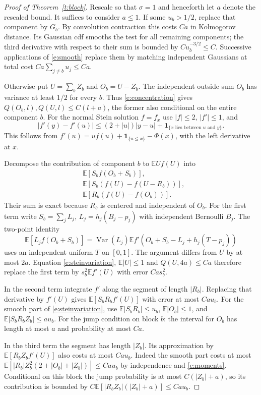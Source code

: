 \documentclass[11pt]{article}
\newcommand{\E}{\mathbb E}
\newcommand{\Var}{\operatorname{Var}}
\newcommand{\ind}{\mathbf1}
\numberwithin{equation}{section}
\begin{document}
\begin{proof}[Proof of Theorem~\ref{t:block}]
Rescale so that $\sigma=1$ and henceforth let $a$ denote the rescaled bound.
It suffices to consider $a\le1$. If some $u_b>1/2$, replace that component by $G_b$.
By convolution contraction this costs $Ca$ in Kolmogorov distance. Its Gaussian
cdf smooths the test for all remaining components; the third derivative with respect
to their sum is bounded by $C u_b^{-3/2}\le C$. Successive applications of
\eqref{e:smooth} replace them by matching independent Gaussians at total cost
$Ca\sum_{j\ne b}u_j\le Ca$.

Otherwise put $U=\sum_b Z_b$ and $O_b=U-Z_b$.
The independent outside sum $O_b$ has variance at least $1/2$ for every $b$.
Thus \eqref{e:concentration} gives $Q(O_b,l),Q(U,l)\le C(l+a)$, the former also
conditional on the entire component $b$. For the normal Stein solution $f=f_x$ use
$|f|\le2$, $|f'|\le1$, and
\begin{equation}\label{e:steinvariation}
 |f'(y)-f'(u)|\le (2+|u|)|y-u|+
 \ind_{\{x\text{ lies between }u\text{ and }y\}} .
\end{equation}
This follows from $f'(u)=uf(u)+\ind_{\{u\le x\}}-\Phi(x)$, with the left
derivative at $x$.

Decompose the contribution of component $b$ to $\E U f(U)$ into
\begin{align*}
 &\E[S_b f(O_b+S_b)],\\
 &\E[S_b(f(U)-f(U-R_b))],\\
 &\E[R_b(f(U)-f(O_b))].
\end{align*}
Their sum is exact because $R_b$ is centered and independent of $O_b$.
For the first term write $S_b=\sum_j L_j$, $L_j=h_j(B_j-p_j)$ with independent
Bernoulli $B_j$. The two-point identity
\[
 \E[L_j f(O_b+S_b)]
 =\Var(L_j)\E f'(O_b+S_b-L_j+h_j(T-p_j))
\]
uses an independent uniform $T$ on $[0,1]$. The argument differs from $U$ by at
most $2a$. Equation \eqref{e:steinvariation}, $\E|U|\le1$ and $Q(U,4a)\le Ca$
therefore replace the first term by $s_b^2\E f'(U)$ with error $Ca s_b^2$.

In the second term integrate $f'$ along the segment of length $|R_b|$. Replacing
that derivative by $f'(U)$ gives $\E[S_bR_b f'(U)]$ with error at most $Ca u_b$.
For the smooth part of \eqref{e:steinvariation}, use $\E|S_bR_b|\le u_b$,
$\E|O_b|\le1$, and $\E|S_bR_bZ_b|\le a u_b$.
For the jump condition on block $b$: the interval for $O_b$ has length at most $a$
and probability at most $Ca$.

In the third term the segment has length $|Z_b|$. Its approximation by
$\E[R_b Z_b f'(U)]$ also costs at most $Ca u_b$. Indeed the smooth part costs at
most $\E[|R_b|Z_b^2(2+|O_b|+|Z_b|)]\le Ca u_b$ by independence and
\eqref{e:moments}. Conditional on this block the jump probability is at most
$C(|Z_b|+a)$, so its contribution is bounded by
$C\E[|R_bZ_b|(|Z_b|+a)]\le Ca u_b$.


\end{proof}
\end{document}
